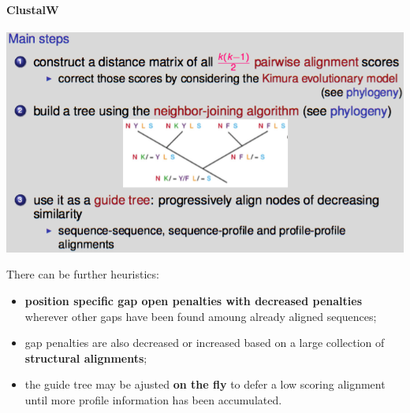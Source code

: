 \paragraph{ClustalW}

\begin{center}
	\includegraphics[scale=0.5]{images/36_clustalW.png}
\end{center}

There can be further heuristics:
\begin{itemize}
	\item \textbf{position specific gap open penalties with decreased penalties} wherever other gaps have been found amoung already aligned sequences;
	\item gap penalties are also decreased or increased based on a large collection of \textbf{structural alignments};
	\item the guide tree may be ajusted \textbf{on the fly} to defer a low scoring alignment until more profile information has been accumulated.
\end{itemize}

